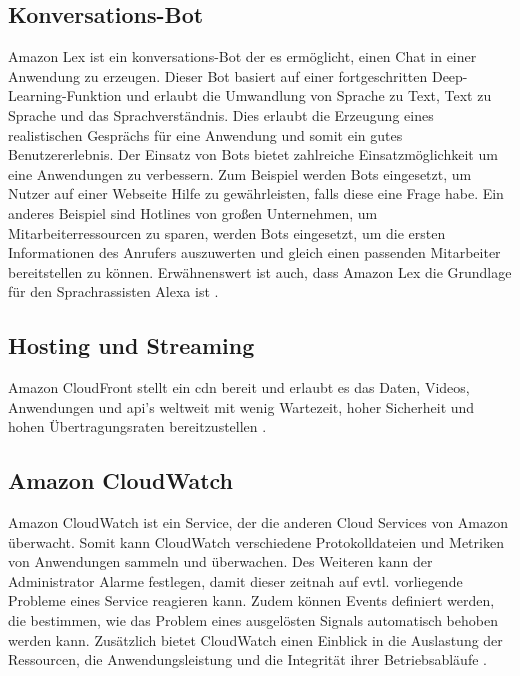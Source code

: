 \subsection{Konversations-Bot}
Amazon Lex ist ein konversations-Bot der es ermöglicht, einen Chat in einer Anwendung zu erzeugen. Dieser Bot basiert auf einer fortgeschritten Deep-Learning-Funktion und erlaubt die Umwandlung von Sprache zu Text, Text zu Sprache und das Sprachverständnis. Dies erlaubt die Erzeugung eines realistischen Gesprächs für eine Anwendung und somit ein gutes Benutzererlebnis. Der Einsatz von Bots bietet zahlreiche Einsatzmöglichkeit um eine Anwendungen zu verbessern. Zum Beispiel werden Bots eingesetzt, um Nutzer auf einer Webseite Hilfe zu gewährleisten, falls diese eine Frage habe. Ein anderes Beispiel sind Hotlines von großen Unternehmen, um Mitarbeiterressourcen zu sparen, werden Bots eingesetzt, um die ersten Informationen des Anrufers auszuwerten und gleich einen passenden Mitarbeiter bereitstellen zu können. Erwähnenswert ist auch, dass Amazon Lex die Grundlage für den Sprachrassisten Alexa ist \cite{AmazonLex}.

\subsection{Hosting und Streaming}
Amazon CloudFront stellt ein \gls{cdn} bereit und erlaubt es das Daten, Videos, Anwendungen und \gls{api}'s weltweit mit wenig Wartezeit, hoher Sicherheit und hohen Übertragungsraten bereitzustellen \cite{AmazonCloudFront}. 

\subsection{Amazon CloudWatch}
Amazon CloudWatch ist ein Service, der die anderen Cloud Services von Amazon überwacht. Somit kann CloudWatch verschiedene Protokolldateien und Metriken von Anwendungen sammeln und überwachen. Des Weiteren kann der Administrator Alarme festlegen, damit dieser zeitnah auf evtl. vorliegende Probleme eines Service reagieren kann. Zudem können Events definiert werden, die bestimmen, wie das Problem eines ausgelösten Signals automatisch behoben werden kann. Zusätzlich bietet CloudWatch einen Einblick in die Auslastung der Ressourcen, die Anwendungsleistung und die Integrität ihrer Betriebsabläufe \cite{AmazonCloudWatch}.
